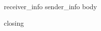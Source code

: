 
\begin{letter} 
{{{receiver_info}}}
{{sender_info}}
{}
{{body}}
\closing{{{closing}}}
\end{letter}

